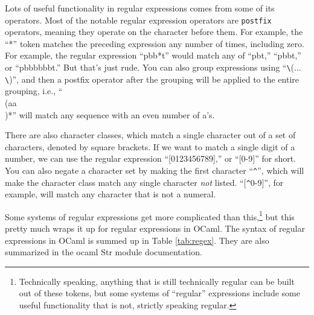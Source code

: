 \documentclass[10pt]{book}
\begin{document}
Lots of useful functionality in regular expressions comes from some of its operators. Most of the notable regular expression operators are {\tt postfix} operators, meaning they operate on the character before them. For example, the ``*'' token matches the preceding expression any number of times, including zero. For example, the regular expression ``pbb*t'' would match any of ``pbt,'' ``pbbt,'' or ``pbbbbbbt.'' But that's just rude. You can also group expressions using ``\verb"\"(... \verb"\")'', and then a postfix operator after the grouping will be applied to the entire grouping, i.e., ``\\(aa\\)*'' will match any sequence with an even number of a's.

There are also character classes, which match a single character out
of a set of characters, denoted by square brackets. If we want to
match a single digit of a number, we can use the regular expression
``[0123456789],'' or ``[0-9]'' for short. You can also negate a
character set by making the first character ``\verb"^"'', which will make
the character class match any single character {\em not}
listed. ``[\verb"^"0-9]'', for example, will match any character that is not
a numeral.

Some systems of regular expressions get more complicated than this,\footnote{Technically speaking, anything that is still technically regular can be built out of these tokens, but some systems of ``regular'' expressions include some useful functionality that is not, strictly speaking regular.} but this pretty much wraps it up for regular expressions in OCaml. The syntax of regular expressions in OCaml is summed up in Table \ref{tab:regex}. They are also summarized in the ocaml Str module documentation.
\end{document}
